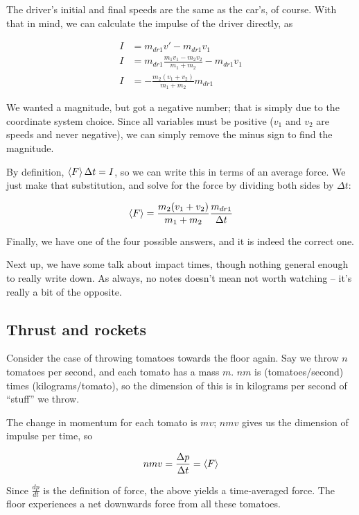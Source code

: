 \documentclass[12pt,a4paper]{report}
\begin{document}
The driver's initial and final speeds are the same as the car's, of course. With that in mind, we can calculate the impulse of the driver directly, as

\begin{align}
I &= m_{dr1} v' - m_{dr1} v_1\\
I &= m_{dr1}  \frac{m_1 v_1 - m_2 v_2}{m_1 + m_2} - m_{dr1} v_1\\
I &= - \frac{m_2(v_1 + v_2)}{m_1 + m_2} m_{dr1}
\end{align}

We wanted a magnitude, but got a negative number; that is simply due to the coordinate system choice. Since all variables must be positive ($v_1$ and $v_2$ are speeds and never negative), we can simply remove the minus sign to find the magnitude.

By definition, $\Braket{F} \Delta t = I$, so we can write this in terms of an average force. We just make that substitution, and solve for the force by dividing both sides by $\Delta t$:

\begin{equation}
\Braket{F} = \frac{m_2(v_1 + v_2)}{m_1 + m_2} \frac{m_{dr1}}{\Delta t}
\end{equation}

Finally, we have one of the four possible answers, and it is indeed the correct one.

Next up, we have some talk about impact times, though nothing general enough to really write down. As always, no notes doesn't mean not worth watching -- it's really a bit of the opposite.

\subsection{Thrust and rockets}

Consider the case of throwing tomatoes towards the floor again. Say we throw $n$ tomatoes per second, and each tomato has a mass $m$. $n m$ is (tomatoes/second) times (kilograms/tomato), so the dimension of this is in kilograms per second of ``stuff'' we throw.

The change in momentum for each tomato is $m v$; $n m v$ gives us the dimension of impulse per time, so

\begin{equation}
n m v = \frac{\Delta p}{\Delta t} = \Braket{F}
\end{equation}

Since $\displaystyle \frac{dp}{dt}$ is the definition of force, the above yields a time-averaged force. The floor experiences a net downwards force from all these tomatoes.
\end{document}

